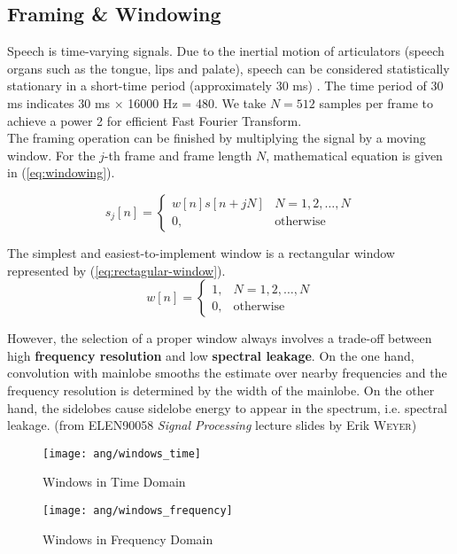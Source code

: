 \subsection{Framing \& Windowing}

Speech is time-varying signals. Due to the inertial motion of articulators (speech organs such as the tongue, lips and palate), speech can be considered statistically stationary in a short-time period (approximately 30 ms) \cite{brandstein1995practical}. The time period of 30 ms indicates 30 ms $\times$ 16000 Hz = 480. We take $N = 512$ samples per frame to achieve a power 2 for efficient Fast Fourier Transform.\\

The framing operation can be finished by multiplying the signal by a moving window. For the $j$-th frame and frame length $N$, mathematical equation is given in (\ref{eq:windowing}).

\begin{equation}
\label{eq:windowing}
s_j[n] =
\begin{cases}
w[n] s[n+jN] & N = 1, 2, \dots, N\\
0, & \text{otherwise}
\end{cases}
\end{equation}

The simplest and easiest-to-implement window is a rectangular window represented by (\ref{eq:rectagular-window}).
\begin{equation}
\label{eq:rectagular-window}
w[n] =
\begin{cases}
1, & N = 1, 2, \dots, N\\
0, & \text{otherwise}
\end{cases}
\end{equation}

However, the selection of a proper window always involves a trade-off between high \textbf{frequency resolution} and low \textbf{spectral leakage}. On the one hand, convolution with mainlobe smooths the estimate over nearby frequencies and the frequency resolution is determined by the width of the mainlobe. On the other hand, the sidelobes cause sidelobe energy to appear in the spectrum, i.e. spectral leakage. (from ELEN90058 \textit{Signal Processing} lecture slides by Erik \textsc{Weyer})

\begin{figure}[H]
\begin{minipage}[t]{0.5\linewidth}
\centering
\texttt{[image: ang/windows\_time]}
\caption{Windows in Time Domain}
\label{windows_time}
\end{minipage}
\begin{minipage}[t]{0.5\linewidth}
\centering
\texttt{[image: ang/windows\_frequency]}
\caption{Windows in Frequency Domain}
\label{windows_frequency}
\end{minipage}
\end{figure}

